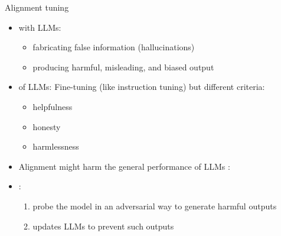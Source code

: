 \documentclass[10pt]{beamer}
\begin{document}
\begin{frame}{Alignment tuning}


\begin{itemize}
\item {} with LLMs:
\begin{itemize}
\item fabricating false information (hallucinations)
\item producing harmful, misleading, and biased output
\end{itemize}
\pause
\item {} of LLMs: Fine-tuning (like instruction tuning) but different criteria:
\begin{itemize}
\item helpfulness
\item honesty
\item harmlessness
\end{itemize}
\pause
\item Alignment might harm the general performance of LLMs : %
\item {}:
\begin{enumerate}
\item probe the model in an adversarial way to generate harmful outputs
\item updates LLMs to prevent such outputs
\end{enumerate}
\end{itemize}
\end{frame}
\end{document}
